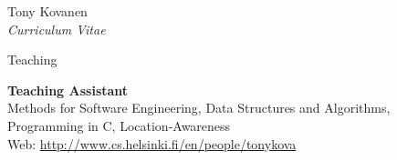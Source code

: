 \documentclass[10pt]{article}
\begin{document}
\begin{cv}{Tony Kovanen\\{\large \itshape Curriculum Vitae}}
\begin{cvlist}{Teaching}
	\item {\bf Teaching Assistant}\\
		Methods for Software Engineering, Data Structures and Algorithms, Programming in C, Location-Awareness\\
		Web: \url{http://www.cs.helsinki.fi/en/people/tonykova}
		
\end{cvlist}	



%


\end{cv}
\end{document}
